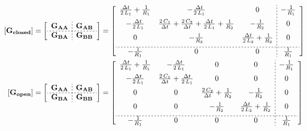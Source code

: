 \documentclass[10pt, oneside, letterpaper]{article}
\begin{document}
\begin{alignat}{2}
  \left[
  \mathbf{G_{closed}}\right] &= \left[
      \begin{array}{c;{2pt/2pt}c}
        \mathbf{G_{AA}} & \mathbf{G_{AB}} \\ \hdashline[2pt/2pt]
        \mathbf{G_{BA}} & \mathbf{G_{BB}} 
      \end{array}
    \right] = \left[
      \begin{array}{ccc;{2pt/2pt}c}
        \frac{\Delta{}t}{2\,L_{1}}+\frac{1}{R_{1}} & -\frac{\Delta{}t}{2\,L_{1}} & 0 & -\frac{1}{R_{1}} \\ [6pt]
        -\frac{\Delta{}t}{2\,L_{1}} & \frac{2\,C_{1}}{\Delta{}t}+\frac{2\,C_{2}}{\Delta{}t}+\frac{\Delta{}t}{2\,L_{1}}+\frac{1}{R_{2}} & -\frac{1}{R_{2}} & 0 \\ [6pt]
        0 & -\frac{1}{R_{2}} & \frac{\Delta{}t}{2\,L_{2}}+\frac{1}{R_{2}} & 0 \\ [6pt] \hdashline[2pt/2pt]
        -\frac{1}{R_{1}} & 0 & 0 & \frac{1}{R_{1}}
      \end{array}
  \right] \\
  \left[
  \mathbf{G_{open}}\right] &= \left[
      \begin{array}{c;{2pt/2pt}c}
        \mathbf{G_{AA}} & \mathbf{G_{AB}} \\ \hdashline[2pt/2pt]
        \mathbf{G_{BA}} & \mathbf{G_{BB}} 
      \end{array}
    \right] = \left[\begin{array}{cccc;{2pt/2pt}c} \frac{\Delta{}t}{2\,L_{1}}+\frac{1}{R_{1}} & -\frac{\Delta{}t}{2\,L_{1}} & 0 & 0 & -\frac{1}{R_{1}} \\ [6pt]
    -\frac{\Delta{}t}{2\,L_{1}} & \frac{2\,C_{1}}{\Delta{}t}+\frac{\Delta{}t}{2\,L_{1}} & 0 & 0 & 0 \\ [6pt]
    0 & 0 & \frac{2\,C_{2}}{\Delta{}t}+\frac{1}{R_{2}} & -\frac{1}{R_{2}} & 0 \\ [6pt]
    0 & 0 & -\frac{1}{R_{2}} & \frac{\Delta{}t}{2\,L_{2}}+\frac{1}{R_{2}} & 0 \\ [6pt] \hdashline[2pt/2pt]
    -\frac{1}{R_{1}} & 0 & 0 & 0 & \frac{1}{R_{1}} \end{array}\right]
\end{alignat}
\end{document}
